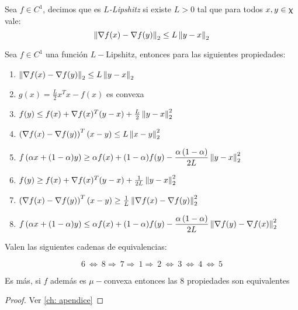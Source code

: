 \begin{definition}
	\label{def: L Lipshitz}
	Sea $f \in C^1$, decimos que es $L$\textit{-Lipshitz} si existe $L > 0$ tal que para todos $x,y \in \upchi$ vale:
	\begin{equation}
	\left\lVert\nabla f(x) - \nabla f (y)\right\rVert_2 \leq  L\left\lVert y-x\right\rVert_2
	\end{equation}
\end{definition}

\begin{proposition}
	\label{prop: Implicancias L lipshitz}
	Sea $f \in C^1$ una funci\'on $L-$Lipshitz, entonces para las siguientes propiedades:
	\begin{enumerate}
		\item $\left\lVert\nabla f(x) - \nabla f (y)\right\rVert_2 \leq  L\left\lVert y-x\right\rVert_2$
		\item $g(x) = \frac{L}{2} x^Tx - f(x)$ es convexa
		\item $f(y) \leq f(x) + \nabla f(x)^T (y-x) + \frac{L}{2}\left\lVert y-x\right\rVert_2^2$
		\item $\left(\nabla f(x) - \nabla f(y)\right)^T (x-y) \leq L\left\lVert x-y\right\rVert^2_2$
		\item $f\left(\alpha x + (1-\alpha)y\right) \geq \alpha f(x) + (1-\alpha) f(y) - \dfrac{\alpha \left(1 - \alpha \right)}{2L}\left\lVert y-x\right\rVert_2^2$
		\item $f(y) \geq f(x) + \nabla f(x)^T (y-x) +\frac{1}{2L} \left\lVert y-x\right\rVert^2_2$
		\item $\left(\nabla f(x) - \nabla f(y)\right)^T (x-y) \geq \frac{1}{L}\left\lVert\nabla f(x)- \nabla f(y)\right\rVert^2_2$
		\item $f\left(\alpha x + (1-\alpha)y\right) \leq \alpha f(x) + (1-\alpha) f(y) - \dfrac{\alpha \left(1 - \alpha \right)}{2L}\left\lVert\nabla f(y)- \nabla f (x)\right\rVert_2^2$
	\end{enumerate}

	Valen las siguientes cadenas de equivalencias:
	
	\begin{equation*}
		6 \ \Longleftrightarrow \ 8 \Longrightarrow \ 7 \Longrightarrow \ 1 \Longrightarrow \ 2 \ \Longleftrightarrow \ 3 \ \Longleftrightarrow \ 4 \ \Longleftrightarrow \ 5
	\end{equation*}
	
	Es m\'as, si $f$ adem\'as es $\mu-$convexa entonces las 8 propiedades son equivalentes
\end{proposition}

\begin{proof}
	Ver \ref{ch: apendice}
\end{proof}

